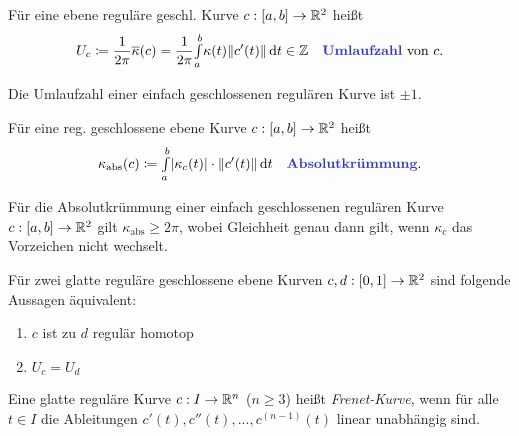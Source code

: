 \documentclass{cheat-sheet}
\newcommand{\Intabdt}[1]{\Int{a}{b}{#1}{t}}
\begin{document}
\begin{satz}
  Für eine ebene reguläre geschl. Kurve $c : \left[ a, b \right] \to \mathbb{R}^2$ heißt
  \[
    U_c \coloneqq \frac{1}{2 \pi} \overline\kappa(c) = \frac{1}{2 \pi} \Intabdt{\kappa(t) \norm{c'(t)}} \in \Z
    \quad \text{\emph{Umlaufzahl} von $c$}.
  \]
\end{satz}

\begin{satz}
  Die Umlaufzahl einer einfach geschlossenen regulären Kurve ist $\pm 1$.
\end{satz}

\begin{defn}
  Für eine reg. geschlossene ebene Kurve $c : \left[ a, b \right] \to \mathbb{R}^2$ heißt
  \[
    \kappa_{\mathrm{abs}}(c) \coloneqq \Int{a}{b}{\abs{\kappa_c(t)} \cdot \norm{c'(t)}}{t}
    \quad \text{\emph{Absolutkrümmung}.}
  \]
\end{defn}

\begin{satz}
  Für die Absolutkrümmung einer einfach geschlossenen regulären Kurve $c : \left[ a, b \right] \to \mathbb{R}^2$ gilt $\kappa_{\text{abs}} \geq 2 \pi$, wobei Gleichheit genau dann gilt, wenn $\kappa_c$ das Vorzeichen nicht wechselt.
\end{satz}


\begin{satz}
  Für zwei glatte reguläre geschlossene ebene Kurven $c, d : \left[ 0, 1 \right] \to \mathbb{R}^2$ sind folgende Aussagen äquivalent:
  \begin{multicols}{2}
    \begin{enumerate}[label=(\roman*),leftmargin=2em]
      \item $c$ ist zu $d$ regulär homotop
      \item $U_c = U_d$
    \end{enumerate}
  \end{multicols}
\end{satz}



\begin{defn}
  Eine glatte reguläre Kurve $c : I \to \mathbb{R}^n$ ($n \geq 3$) heißt \emph{Frenet-Kurve}, wenn für alle $t \in I$ die Ableitungen $c'(t), c''(t), ..., c^{(n-1)}(t)$ linear unabhängig sind.
\end{defn}
\end{document}
